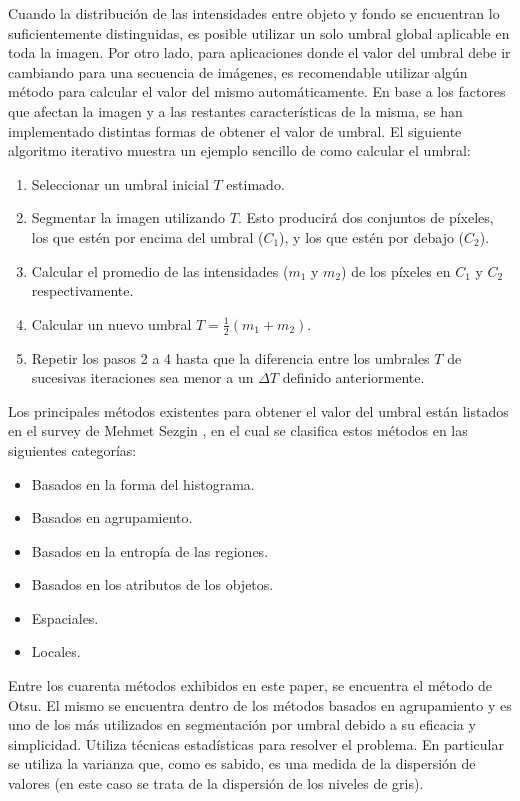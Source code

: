 Cuando la distribución de las intensidades entre objeto y fondo se encuentran lo suficientemente distinguidas, es posible utilizar un solo umbral global aplicable en toda la imagen. Por otro lado, para aplicaciones donde el valor del umbral debe ir cambiando para una secuencia de imágenes, es recomendable utilizar algún método para calcular el valor del mismo automáticamente. En base a los factores que afectan la imagen y a las restantes características de la misma, se han implementado distintas formas de obtener el valor de umbral. El siguiente algoritmo iterativo muestra un ejemplo sencillo de como calcular el umbral:

\begin{enumerate}
\item Seleccionar un umbral inicial $T$ estimado.
\item Segmentar la imagen utilizando $T$. Esto producirá dos conjuntos de píxeles, los que estén por encima del umbral ($C_1$), y los que estén por debajo ($C_2$).
\item Calcular el promedio de las intensidades ($m_1$ y $m_2$) de los píxeles en $C_1$ y $C_2$ respectivamente.
\item Calcular un nuevo umbral $T = \frac{1}{2}(m_1 + m_2)$.
\item Repetir los pasos 2 a 4 hasta que la diferencia entre los umbrales $T$ de sucesivas iteraciones sea menor a un ${\Delta}T$ definido anteriormente.
\end{enumerate}

Los principales métodos existentes para obtener el valor del umbral están listados en el survey de Mehmet Sezgin \cite{surveyThreshold}, en el cual se clasifica estos métodos en las siguientes categorías:
\begin{itemize}
\item Basados en la forma del histograma.
\item Basados en agrupamiento.
\item Basados en la entropía de las regiones.
\item Basados en los atributos de los objetos.
\item Espaciales.
\item Locales.
\end{itemize}

Entre los cuarenta métodos exhibidos en este paper, se encuentra el método de Otsu\cite{otsu}. El mismo se encuentra dentro de los métodos basados en agrupamiento y es uno de los más utilizados en segmentación por umbral debido a su eficacia y simplicidad. Utiliza técnicas estadísticas para resolver el problema. En particular se utiliza la varianza que, como es sabido, es una medida de la dispersión de valores (en este caso se trata de la dispersión de los niveles de gris).

